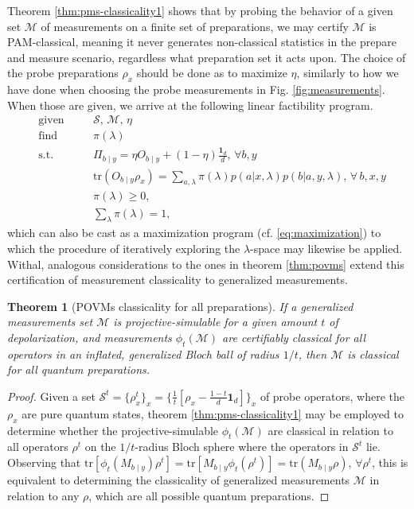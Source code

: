 \documentclass[a4paper,preprintnumbers,floatfix,superscriptaddress,pra,twocolumn,showpacs,notitlepage,longbibliography]{revtex4-2}
\newtheorem{thm}{Theorem}[]
\begin{document}
    Theorem \ref{thm:pms-classicality1} shows that by probing the behavior of a given set $\mathcal{M}$ of measurements on a finite set of preparations, we may certify $\mathcal{M}$ is PAM-classical, meaning it never generates non-classical statistics in the prepare and measure scenario, regardless what preparation set it acts upon. The choice of the probe preparations $\rho_x$ should be done as to maximize $\eta$, similarly to how we have done when choosing the probe measurements in Fig. \ref{fig:measurements}. When those are given, we arrive at the following linear factibility program.
    \begin{subequations}
		\begin{alignat}{2}
			&\text{given}    &\quad & \mathcal{S},\, \mathcal{M},\, \eta \\
	        &\text{find}   &	  & \pi(\lambda) \\
			&\text{s.t.}    &      & \Pi_{b \mid y} = \eta O_{b \mid y} + (1 - \eta) \frac{\bm{1}_d}{d}, \,\forall b, y \\
			&                  &      & \text{tr}(O_{b \mid y} \rho_x) = \sum_{a, \lambda} \pi(\lambda) p(a \vert x, \lambda) p(b \vert a, y, \lambda), \,\forall\, b, x, y \label{eq:program-model}\\
			&				   &	  & \pi(\lambda) \geq 0, \\
			&				   &	  & \sum_\lambda \pi(\lambda) = 1,
		\end{alignat}
		\label{eq:classical-measurements-maximization}
	\end{subequations}
    which can also be cast as a maximization program (cf. \ref{eq:maximization}) 
    to which the procedure of iteratively exploring the $\lambda$-space may likewise be applied. Withal, analogous considerations to the ones in theorem \ref{thm:povms} extend this certification of measurement classicality to generalized measurements.
    \begin{thm}[POVMs classicality for all preparations]
        If a generalized measurements set $\mathcal{M}$ is projective-simulable for a given amount $t$ of depolarization, and measurements $\phi_t(\mathcal{M})$ are certifiably classical for all operators in an inflated, generalized Bloch ball of radius $1/t$, then $\mathcal{M}$ is classical for all quantum preparations. 
        \label{thm:povms-classicality}
    \end{thm}
    \begin{proof}
        Given a set $\mathcal{S}^t = \{ \rho_x^t \}_x = \{ \frac{1}{t} \left[ \rho_x - \frac{1-t}{d} \bm{1}_d \right] \}_x$ of probe operators, where the $\rho_x$ are pure quantum states, theorem \ref{thm:pms-classicality1} may be employed to determine whether the projective-simulable $\phi_t(\mathcal{M})$ are classical in relation to all operators $\rho^t$ on the $1/t$-radius Bloch sphere where the operators in $\mathcal{S}^t$ lie. Observing that $\text{tr}[ \phi_t( M_{b \mid y}) \rho^t ] = \text{tr}[ M_{b \mid y} \phi_t(\rho^t) ] = \text{tr}( M_{b \mid y} \rho ), \,\forall \rho^t$, this is equivalent to determining the classicality of generalized measurements $\mathcal{M}$ in relation to any $\rho$, which are all possible quantum preparations.
    \end{proof}
    
\end{document}
